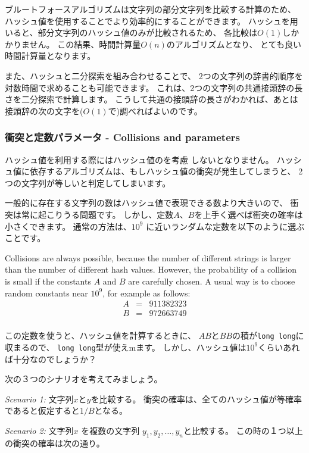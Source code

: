 ブルートフォースアルゴリズムは文字列の部分文字列を比較する計算のため、
ハッシュ値を使用することでより効率的にすることができます。
ハッシュを用いると、部分文字列のハッシュ値のみが比較されるため、
各比較は$O(1)$しかかりません。
この結果、時間計算量$O(n)$のアルゴリズムとなり、
とても良い時間計算量となります。

また、ハッシュと二分探索を組み合わせることで、
2つの文字列の辞書的順序を対数時間で求めることも可能できます。
これは、2つの文字列の共通接頭辞の長さを二分探索で計算します。
こうして共通の接頭辞の長さがわかれば、あとは接頭辞の次の文字を($O(1)$で)調べればよいのです。

\subsubsection*{衝突と定数パラメータ - Collisions and parameters}



ハッシュ値を利用する際にはハッシュ値のを考慮
しないとなりません。
ハッシュ値に依存するアルゴリズムは、もしハッシュ値の衝突が発生してしまうと、
2つの文字列が等しいと判定してしまいます。

一般的に存在する文字列の数はハッシュ値で表現できる数より大きいので、
衝突は常に起こりうる問題です。
しかし、定数$A$、$B$を上手く選べば衝突の確率は小さくできます。
通常の方法は、$10^9$ に近いランダムな定数を以下のように選ぶことです。

Collisions are always possible,
because the number of different strings is larger
than the number of different hash values.
However, the probability of a collision is small
if the constants $A$ and $B$ are carefully chosen.
A usual way is to choose random constants
near $10^9$, for example as follows:
\[
\begin{array}{lcl}
A & = & 911382323 \\
B & = & 972663749 \\
\end{array}
\]

この定数を使うと、ハッシュ値を計算するときに、
$AB$と$BB$の積が\texttt{long long}に収まるので、
\texttt{long long}型が使えmます。
しかし、ハッシュ値は$10^9$くらいあれば十分なのでしょうか？

次の３つのシナリオを考えてみましょう。

\textit{Scenario 1:} 文字列$x$と$y$を比較する。
衝突の確率は、全てのハッシュ値が等確率であると仮定すると$1/B$となる。

\textit{Scenario 2:} 文字列$x$ を複数の文字列
$y_1,y_2,\ldots,y_n$と比較する。
この時の１つ以上の衝突の確率は次の通り。

